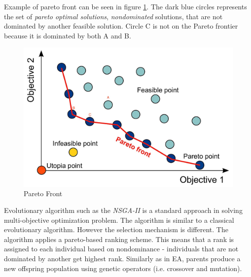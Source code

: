\documentclass[format=acmsmall, review=false, screen=true]{acmart}
\begin{document}
Example of pareto front can be seen in figure \ref{fig:paretofront}. The dark blue circles represents the set of \emph{pareto optimal solutions}, \emph{nondominated} solutions, that are not dominated by another feasible solution. Circle C is not on the Pareto frontier because it is dominated by both A and B.

\begin{figure}[H]
  \includegraphics[width=0.66\linewidth]{img/pareto_front.JPG}
  \caption{\label{fig:paretofront}Pareto Front}
\end{figure}

Evolutionary algorithm such as the \emph{NSGA-II}\cite{deb200fast} is a standard approach in solving multi-objective optimization problem. The algorithm is similar to a classical evolutionary algorithm. However the selection mechanism is different. The algorithm applies a pareto-based ranking scheme. This means that a rank is assigned to each individual based on nondominance - individuals that are not dominated by another get highest rank. Similarly as in EA, parents produce a new offspring population using genetic operators (i.e. crossover and mutation).
\end{document}
